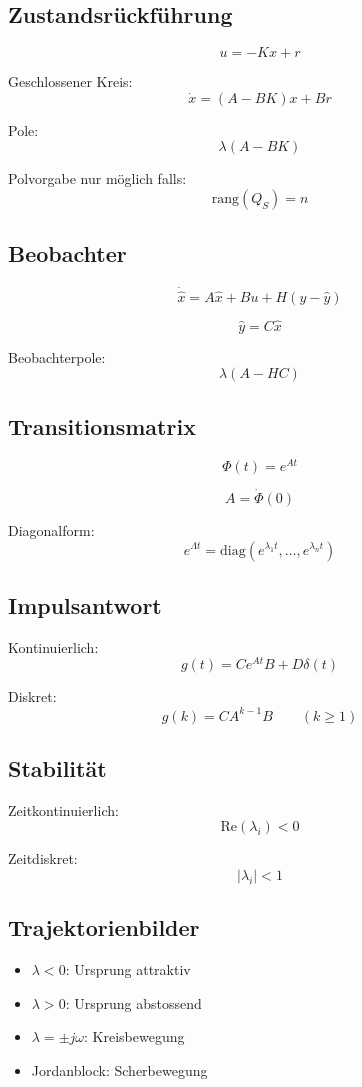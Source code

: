 \subsection*{Zustandsrückführung}
\[
u=-Kx+r
\]

Geschlossener Kreis:
\[
\dot x=(A-BK)x+Br
\]

Pole:
\[
\lambda(A-BK)
\]

Polvorgabe nur möglich falls:
\[
\mathrm{rang}(Q_S)=n
\]

\subsection*{Beobachter}
\[
\dot{\hat x}=A\hat x+Bu+H(y-\hat y)
\]

\[
\hat y=C\hat x
\]

Beobachterpole:
\[
\lambda(A-HC)
\]

\subsection*{Transitionsmatrix}
\[
\Phi(t)=e^{At}
\]

\[
A=\dot{\Phi}(0)
\]

Diagonalform:
\[
e^{\Lambda t}
=
\mathrm{diag}
\left(
e^{\lambda_1 t},
\dots,
e^{\lambda_n t}
\right)
\]

\subsection*{Impulsantwort}
Kontinuierlich:
\[
g(t)=Ce^{At}B+D\delta(t)
\]

Diskret:
\[
g(k)=CA^{k-1}B
\qquad (k\ge 1)
\]

\subsection*{Stabilität}
Zeitkontinuierlich:
\[
\mathrm{Re}(\lambda_i)<0
\]

Zeitdiskret:
\[
|\lambda_i|<1
\]

\subsection*{Trajektorienbilder}
\begin{itemize}
\item $\lambda<0$: Ursprung attraktiv
\item $\lambda>0$: Ursprung abstossend
\item $\lambda=\pm j\omega$: Kreisbewegung
\item Jordanblock: Scherbewegung
\end{itemize}

